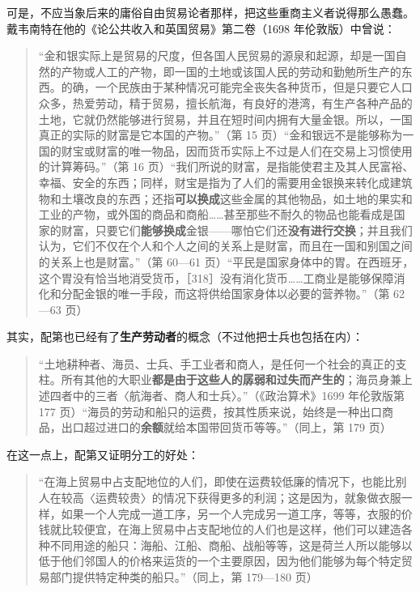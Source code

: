 可是，不应当象后来的庸俗自由贸易论者那样，把这些重商主义者说得那么愚蠢。戴韦南特在他的《论公共收入和英国贸易》第二卷（1698 年伦敦版）中曾说：

\begin{quote}“金和银实际上是贸易的尺度，但各国人民贸易的源泉和起源，却是一国自然的产物或人工的产物，即一国的土地或该国人民的劳动和勤勉所生产的东西。的确，一个民族由于某种情况可能完全丧失各种货币，但是只要它人口众多，热爱劳动，精于贸易，擅长航海，有良好的港湾，有生产各种产品的土地，它就仍然能够进行贸易，并且在短时间内拥有大量金银。所以，一国真正的实际的财富是它本国的产物。”（第 15 页）“金和银远不是能够称为一国的财宝或财富的唯一物品，因而货币实际上不过是人们在交易上习惯使用的计算筹码。”（第 16 页）“我们所说的财富，是指能使君主及其人民富裕、幸福、安全的东西；同样，财宝是指为了人们的需要用金银换来转化成建筑物和土壤改良的东西；还指\textbf{可以换成}这些金属的其他物品，如土地的果实和工业的产物，或外国的商品和商船……甚至那些不耐久的物品也能看成是国家的财富，只要它们\textbf{能够换成}金银——哪怕它们还\textbf{没有进行交换}；并且我们认为，它们不仅在个人和个人之间的关系上是财富，而且在一国和别国之间的关系上也是财富。”（第 60—61 页）“平民是国家身体中的胃。在西班牙，这个胃没有恰当地消受货币，［318］没有消化货币……工商业是能够保障消化和分配金银的唯一手段，而这将供给国家身体以必要的营养物。”（第 62—63 页）\end{quote}

其实，配第也已经有了\textbf{生产劳动者}的概念（不过他把士兵也包括在内）：

\begin{quote}“土地耕种者、海员、士兵、手工业者和商人，是任何一个社会的真正的支柱。所有其他的大职业\textbf{都是由于这些人的孱弱和过失而产生的}；海员身兼上述四者中的三者〈航海者、商人和士兵〉。”（《政治算术》1699 年伦敦版第 177 页）“海员的劳动和船只的运费，按其性质来说，始终是一种出口商品，出口超过进口的\textbf{余额}就给本国带回货币等等。”（同上，第 179 页）\end{quote}

在这一点上，配第又证明分工的好处：

\begin{quote}“在海上贸易中占支配地位的人们，即使在运费较低廉的情况下，也能比别人在较高〈运费较贵〉的情况下获得更多的利润；这是因为，就象做衣服一样，如果一个人完成一道工序，另一个人完成另一道工序，等等，衣服的价钱就比较便宜，在海上贸易中占支配地位的人们也是这样，他们可以建造各种不同用途的船只：海船、江船、商船、战船等等，这是荷兰人所以能够以低于他们邻国人的价格来运货的一个主要原因，因为他们能够为每个特定贸易部门提供特定种类的船只。”（同上，第 179—180 页）\end{quote}

